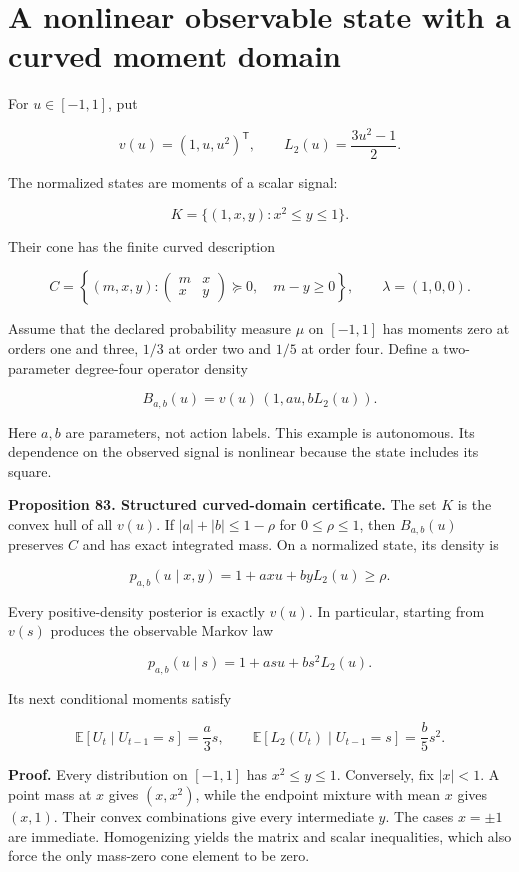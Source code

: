 \section{A nonlinear observable state with a curved moment domain}\label{LSM:a-nonlinear-observable-state-with-a-curved-moment-domain}

For \(u\in[-1,1]\), put

\[
v(u)=(1,u,u^2)^{\mathsf T},
\qquad L_2(u)=\frac{3u^2-1}{2}.
\]

The normalized states are moments of a scalar signal:

\[
K=\{(1,x,y):x^2\leq y\leq1\}.
\]

Their cone has the finite curved description

\[
C=\left\{(m,x,y):
\begin{pmatrix}m&x\\x&y\end{pmatrix}\succeq0,
\quad m-y\geq0\right\},
\qquad\lambda=(1,0,0).
\]

Assume that the declared probability measure \(\mu\) on \([-1,1]\) has
moments zero at orders one and three, \(1/3\) at order two and \(1/5\)
at order four. Define a two-parameter degree-four operator density

\[
\boxed{
B_{a,b}(u)=v(u)\,(1,au,bL_2(u)).
}
\]

Here \(a,b\) are parameters, not action labels. This example is
autonomous. Its dependence on the observed signal is nonlinear because
the state includes its square.

\textbf{Proposition 83. Structured curved-domain certificate.} The set
\(K\) is the convex hull of all \(v(u)\). If \(|a|+|b|\leq1-\rho\) for
\(0\leq\rho\leq1\), then \(B_{a,b}(u)\) preserves \(C\) and has exact
integrated mass. On a normalized state, its density is

\[
p_{a,b}(u\mid x,y)=1+a x u+b yL_2(u)\geq\rho.
\]

Every positive-density posterior is exactly \(v(u)\). In particular,
starting from \(v(s)\) produces the observable Markov law

\[
p_{a,b}(u\mid s)=1+a s u+b s^2L_2(u).
\]

Its next conditional moments satisfy

\[
\boxed{
\mathbb E[U_t\mid U_{t-1}=s]=\frac a3s,
\qquad
\mathbb E[L_2(U_t)\mid U_{t-1}=s]=\frac b5s^2.
}
\]

\textbf{Proof.} Every distribution on \([-1,1]\) has \(x^2\leq y\leq1\).
Conversely, fix \(|x|<1\). A point mass at \(x\) gives \((x,x^2)\),
while the endpoint mixture with mean \(x\) gives \((x,1)\). Their convex
combinations give every intermediate \(y\). The cases \(x=\pm1\) are
immediate. Homogenizing yields the matrix and scalar inequalities, which
also force the only mass-zero cone element to be zero.

